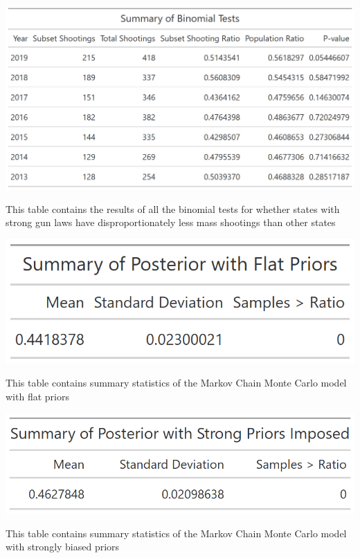 \documentclass{article}
\begin{document}
 
\begin{table}[!h]
    \includegraphics[scale=.4]{Table2.png}
    \caption{This table contains the results of all the binomial tests for whether states with strong gun laws have disproportionately less mass shootings than other states}
    \label{table:2}
\end{table}

\begin{table}[!h]
    \includegraphics[scale=.5]{Table3.png}
    \caption{This table contains summary statistics of the Markov Chain Monte Carlo model with flat priors}
    \label{table:3}
\end{table}

\begin{table}[!h]
    \includegraphics[scale=.5]{Table4.png}
    \caption{This table contains summary statistics of the Markov Chain Monte Carlo model with strongly biased priors}
    \label{table:4}
\end{table}
\end{document}

